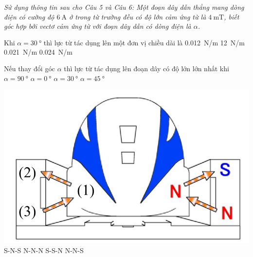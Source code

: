 \textit{Sử dụng thông tin sau cho Câu 5 và Câu 6: Một đoạn dây dẫn thẳng mang dòng điện có cường độ $\SI{6}{\ampere}$ ở trong từ trường đều có độ lớn cảm ứng từ là $\SI{4}{\milli\tesla}$, biết góc hợp bởi vectơ cảm ứng từ với đoạn dây dẫn có dòng điện là $\alpha$.}
\begin{ex}
	Khi $\alpha=\SI{30}{\degree}$ thì lực từ tác dụng lên một đơn vị chiều dài là
	\choice
	{\True \SI{0.012}{\newton/\meter}}
	{\SI{12}{\newton/\meter}}
	{\SI{0.021}{\newton/\meter}}
	{\SI{0.024}{\newton/\meter}}
\end{ex}
\begin{ex}
	Nếu thay đổi góc $\alpha$ thì lực từ tác dụng lên đoạn dây có độ lớn lớn nhất khi
	\choice
	{\True $\alpha=\SI{90}{\degree}$}
	{$\alpha=\SI{0}{\degree}$}
	{$\alpha=\SI{30}{\degree}$}
	{$\alpha=\SI{45}{\degree}$}
	\loigiai{}
\end{ex}
\begin{ex}
	{\vspace{-0.5cm}\includegraphics[scale=0.4]{../figs/FINAL-SEM1-004-1}}
	\choice
	{\True S-N-S}
	{N-N-N}
	{S-S-N}
	{N-N-S}
	\loigiai{}
\end{ex}
